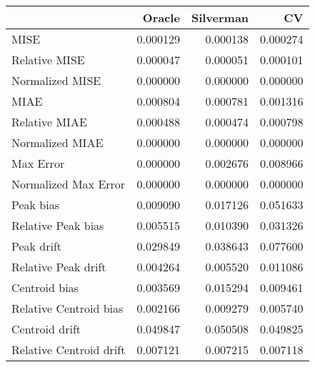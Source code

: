\begin{tabular}{lrrr}
  \hline
 & Oracle & Silverman & CV \\ 
  \hline
MISE & 0.000129 & 0.000138 & 0.000274 \\ 
  Relative MISE & 0.000047 & 0.000051 & 0.000101 \\ 
  Normalized MISE & 0.000000 & 0.000000 & 0.000000 \\ 
  MIAE & 0.000804 & 0.000781 & 0.001316 \\ 
  Relative MIAE & 0.000488 & 0.000474 & 0.000798 \\ 
  Normalized MIAE & 0.000000 & 0.000000 & 0.000000 \\ 
  Max Error & 0.000000 & 0.002676 & 0.008966 \\ 
  Normalized Max Error & 0.000000 & 0.000000 & 0.000000 \\ 
  Peak bias & 0.009090 & 0.017126 & 0.051633 \\ 
  Relative Peak bias & 0.005515 & 0.010390 & 0.031326 \\ 
  Peak drift & 0.029849 & 0.038643 & 0.077600 \\ 
  Relative Peak drift & 0.004264 & 0.005520 & 0.011086 \\ 
  Centroid bias & 0.003569 & 0.015294 & 0.009461 \\ 
  Relative Centroid bias & 0.002166 & 0.009279 & 0.005740 \\ 
  Centroid drift & 0.049847 & 0.050508 & 0.049825 \\ 
  Relative Centroid drift & 0.007121 & 0.007215 & 0.007118 \\ 
   \hline
\end{tabular}
